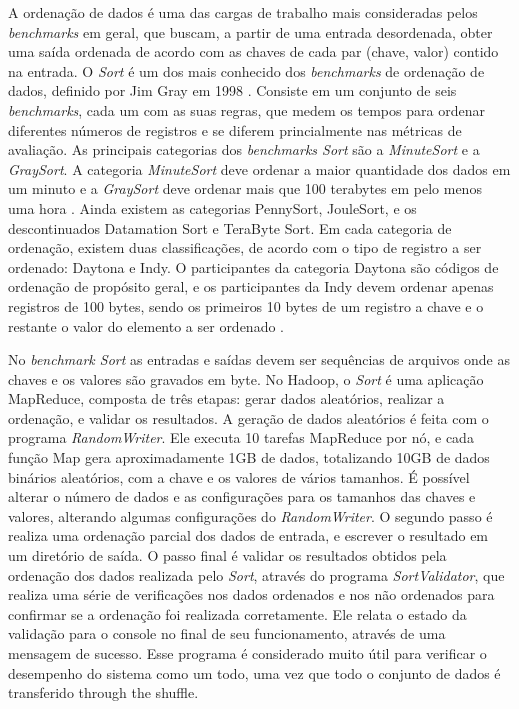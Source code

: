 A ordenação de dados é uma das cargas de trabalho mais consideradas pelos \textit{benchmarks} em geral, que buscam, a partir de uma entrada desordenada, obter uma saída ordenada de acordo com as chaves de cada par (chave, valor) contido na entrada.
O \textit{Sort} é um dos mais conhecido dos \textit{benchmarks} de ordenação de dados, definido por Jim Gray em 1998 \cite{Gray:1998}. 
Consiste em um conjunto de seis \textit{benchmarks}, cada um com as suas regras, que medem os tempos para ordenar diferentes números de registros e se diferem princialmente nas métricas de avaliação. 
As principais categorias dos \textit{benchmarks Sort} são a \textit{MinuteSort} e a \textit{GraySort}. A categoria \textit{MinuteSort} deve ordenar a maior quantidade dos dados em um minuto e a \textit{GraySort} deve ordenar mais que 100 terabytes em pelo menos uma hora \cite{White:2009}. Ainda existem as categorias PennySort, JouleSort, e os descontinuados  Datamation Sort e TeraByte Sort. 
Em cada categoria de ordenação, existem duas classificações, de acordo com o tipo de registro a ser ordenado: Daytona e Indy. O participantes da categoria Daytona são códigos de ordenação de propósito geral, e os participantes da Indy devem ordenar apenas registros de 100 bytes, sendo os primeiros 10 bytes de um registro a chave e o restante o valor do elemento a ser ordenado \cite{SortBenchmark}.


No \textit{benchmark Sort} as entradas e saídas devem ser sequências de arquivos onde as chaves e os valores são gravados em byte. 
No Hadoop, o \textit{Sort} é uma aplicação MapReduce, composta de três etapas: gerar dados aleatórios, realizar a ordenação, e validar os resultados.
A geração de dados aleatórios é feita com o programa \textit{RandomWriter}. Ele executa 10 tarefas MapReduce por nó, e cada função Map gera aproximadamente 1GB de dados, totalizando 10GB de dados binários aleatórios, com a chave e os valores de vários tamanhos. É possível alterar o número de dados e as configurações para os tamanhos das chaves e valores, alterando algumas configurações do \textit{RandomWriter}.
O segundo passo é realiza uma ordenação parcial dos dados de entrada, e escrever o resultado em um diretório de saída. 
O passo final é validar os resultados obtidos pela ordenação dos dados realizada pelo \textit{Sort}, através do programa \textit{SortValidator}, que realiza uma série de verificações nos dados ordenados e nos não ordenados para confirmar se a ordenação foi realizada corretamente. Ele relata o estado da validação para o console no final de seu funcionamento, através de uma mensagem de sucesso. 
Esse programa é considerado muito útil para verificar o desempenho do sistema como um todo, uma vez que todo o conjunto de dados é transferido through the shuffle.

